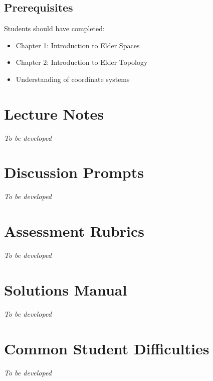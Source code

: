 \documentclass[12pt,a4paper]{article}
\begin{document}
\subsection{Prerequisites}

Students should have completed:
\begin{itemize}
    \item Chapter 1: Introduction to Elder Spaces
    \item Chapter 2: Introduction to Elder Topology
    \item Understanding of coordinate systems
\end{itemize}

\section{Lecture Notes}

\textit{To be developed}

\section{Discussion Prompts}

\textit{To be developed}

\section{Assessment Rubrics}

\textit{To be developed}

\section{Solutions Manual}

\textit{To be developed}

\section{Common Student Difficulties}

\textit{To be developed}
\end{document}
